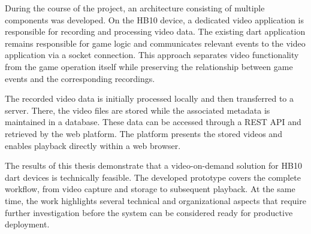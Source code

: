 During the course of the project, an architecture consisting of multiple components was developed. On the HB10 device, a dedicated video application is responsible for recording and processing video data. 
The existing dart application remains responsible for game logic and communicates relevant events to the video application via a socket connection. This approach separates video functionality from the game operation itself while preserving the relationship between game events and the corresponding recordings.

The recorded video data is initially processed locally and then transferred to a server. There, the video files are stored while the associated metadata is maintained in a database. These data can be accessed through a REST API and retrieved by the web platform. 
The platform presents the stored videos and enables playback directly within a web browser.

The results of this thesis demonstrate that a video-on-demand solution for HB10 dart devices is technically feasible. The developed prototype covers the complete workflow, from video capture and storage to subsequent playback. At the same time, 
the work highlights several technical and organizational aspects that require further investigation before the system can be considered ready for productive deployment.

